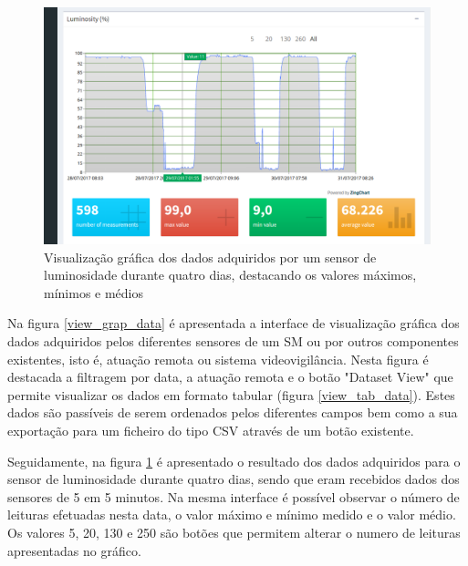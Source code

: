 \begin{figure}[h]
	\centering
	\includegraphics[width=0.9\linewidth]{prints-web/humidity.png}
	\caption{Visualização gráfica dos dados adquiridos por um sensor de luminosidade durante quatro dias, destacando os valores máximos, mínimos e médios}
	\label{grafico_humidade}
\end{figure}



Na figura \ref{view_grap_data} é apresentada a interface de visualização gráfica dos dados adquiridos pelos diferentes sensores de um \acl{SM} ou por outros componentes existentes, isto é, atuação remota ou sistema videovigilância. Nesta figura é destacada a filtragem por data, a atuação remota e o botão "Dataset View" que permite visualizar os dados em formato tabular (figura \ref{view_tab_data}). Estes dados são passíveis de serem ordenados pelos diferentes campos bem como a sua exportação para um ficheiro do tipo \ac{CSV} através de um botão existente. 


Seguidamente, na figura \ref{grafico_humidade} é apresentado o resultado dos dados adquiridos para o sensor de luminosidade durante quatro dias, sendo que eram recebidos dados dos sensores de 5 em 5 minutos. Na mesma interface é possível observar o número de leituras efetuadas nesta data, o valor máximo e mínimo medido e o valor médio. Os valores 5, 20, 130 e 250 são botões que permitem alterar o numero de leituras apresentadas no gráfico. 
 

